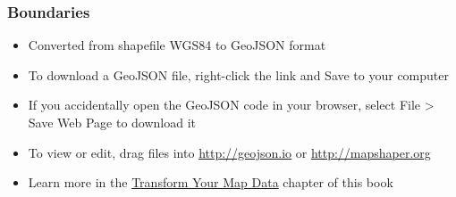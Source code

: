 \documentclass[
  english,
]{book}
\providecommand{\tightlist}{%
  \setlength{\itemsep}{0pt}\setlength{\parskip}{0pt}}
\begin{document}
\hypertarget{boundaries-1}{%
\subsubsection*{Boundaries}\label{boundaries-1}}

\begin{itemize}
\tightlist
\item
  Converted from shapefile WGS84 to GeoJSON format
\item
  To download a GeoJSON file, right-click the link and Save to your computer
\item
  If you accidentally open the GeoJSON code in your browser, select File \textgreater{} Save Web Page to download it
\item
  To view or edit, drag files into \url{http://geojson.io} or \url{http://mapshaper.org}
\item
  Learn more in the \href{transform.html}{Transform Your Map Data} chapter of this book
\end{itemize}
\end{document}
